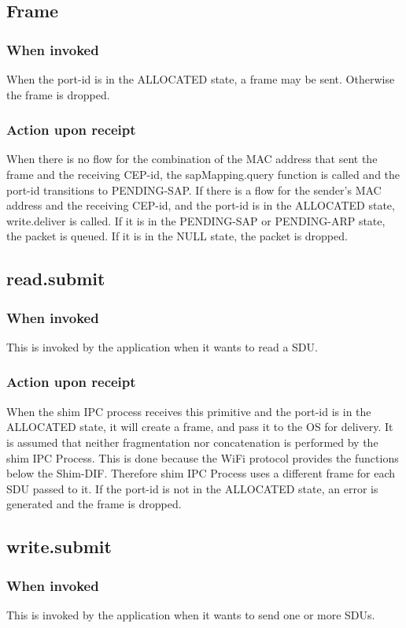 \subsection{Frame}
\subsubsection{When invoked}
When the port-id is in the ALLOCATED state, a frame may be sent.  Otherwise the frame is dropped.
\subsubsection{Action upon receipt}
When there is no flow for the combination of the MAC address that sent the frame and the receiving CEP-id, the sapMapping.query function is called and the port-id transitions to PENDING-SAP. If there is a flow for the sender's MAC address and the receiving CEP-id, and the port-id is in the ALLOCATED state, write.deliver is called. If it is in the PENDING-SAP or PENDING-ARP state, the packet is queued. If it is in the NULL state, the packet is dropped.


\subsection{read.submit}
\subsubsection{When invoked}
This is invoked by the application when it wants to read a SDU.
\subsubsection{Action upon receipt}
When the shim IPC process receives this primitive and the port-id is in the ALLOCATED state, it will create a frame, and pass it to the OS for delivery. It is assumed that neither fragmentation nor concatenation is performed by the shim IPC Process. This is done because the WiFi protocol provides the functions below the Shim-DIF. Therefore shim IPC Process uses a different frame for each SDU passed to it. If the port-id is not in the ALLOCATED state, an error is generated and the frame is dropped.


\subsection{write.submit}
\subsubsection{When invoked}
This is invoked by the application when it wants to send one or more SDUs. 

